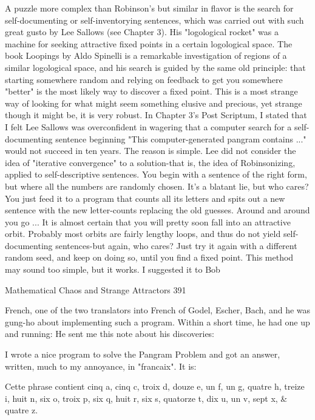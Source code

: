         A puzzle more complex than Robinson's but similar in flavor is the search for
self-documenting or self-inventorying sentences, which was carried out with such
great gusto by Lee Sallows (see Chapter 3). His "logological rocket" was a machine
for seeking attractive fixed points in a certain logological space. The book Loopings
by Aldo Spinelli is a remarkable investigation of regions of a similar logological
space, and his search is guided by the same old principle: that starting somewhere
random and relying on feedback to get you somewhere "better" is the most likely way
to discover a fixed point. This is a most strange way of looking for what might seem
something elusive and precious, yet strange though it might be, it is very robust.
        In Chapter 3's Post Scriptum, I stated that I felt Lee Sallows was overconfident
in wagering that a computer search for a self-documenting sentence beginning "This
computer-generated pangram contains ..." would not succeed in ten years. The reason
is simple. Lee did not consider the idea of "iterative convergence" to a solution-that is,
the idea of Robinsonizing, applied to self-descriptive sentences. You begin with a
sentence of the right form, but where all the numbers are randomly chosen. It's a
blatant lie, but who cares? You just feed it to a program that counts all its letters and
spits out a new sentence with the new letter-counts replacing the old guesses. Around
and around you go ... It is almost certain that you will pretty soon fall into an
attractive orbit. Probably most orbits are fairly lengthy loops, and thus do not yield
self-documenting sentences-but again, who cares? Just try it again with a different
random seed, and keep on doing so, until you find a fixed point.
        This method may sound too simple, but it works. I suggested it to Bob




Mathematical Chaos and Strange Attractors                                             391

French, one of the two translators into French of Godel, Escher, Bach, and he was
gung-ho about implementing such a program. Within a short time, he had one up and
running: He sent me this note about his discoveries:

  I wrote a nice program to solve the Pangram Problem and got an answer,
  written, much to my annoyance, in "francaix". It is:

             Cette phrase contient cinq a, cinq c, troix d, douze e, un f, un g,
     quatre h, treize i, huit n, six o, troix p, six q, huit r, six s, quatorze t, dix u,
     un v, sept x, \& quatre z.

